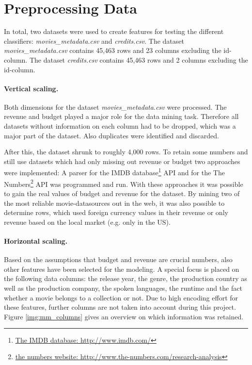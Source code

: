 \section{Preprocessing Data}
\label{cha:preprocessing}

In total, two datasets were used to create features for testing the different classifiers:
\textit{movies\_metadata.csv} and \textit{credits.csv}. The dataset \textit{movies\_metadata.csv} contains 45,463 rows and 23 columns excluding the id-column. The dataset \textit{credits.csv} contains 45,463 rows and 2 columns excluding the id-column.

\paragraph{Vertical scaling.}
Both dimensions for the dataset \textit{movies\_metadata.csv} were processed. The revenue and budget played a major role for the data mining task. Therefore all datasets without information on each column had to be dropped, which was a major part of the dataset. Also duplicates were identified and discarded. 
 
After this, the dataset shrunk to roughly 4,000 rows. To retain some numbers and still use datasets which had only missing out revenue or budget two approaches were implemented: A parser for the IMDB database\footnote{
\hyperref{http://www.imdb.com/}{external_sources}{ref:IMDB}{The IMDB database: http://www.imdb.com/}} API and for the The Numbers\footnote{\hyperref{http://www.the-numbers.com/research-analysis}{external_sources}{ref:numbers}{the numbers website: http://www.the-numbers.com/research-analysis}} API was programmed and run. With these approaches it was possible to gain the real values of budget and revenue for the dataset. By mining two of the most reliable movie-datasources out in the web, it was also possible to determine rows, which used foreign currency values in their revenue or only revenue based on the local market (e.g. only in the US).

\paragraph{Horizontal scaling.}
Based on the assumptions that budget and revenue are crucial numbers, also other features have been selected for the modeling. A special focus is placed on the following data columns: the release year, the genre, the production country as well as the production company, the spoken languages, the runtime and the fact whether a movie belongs to a collection or not. Due to high encoding effort for these features, further columns are not taken into account during this project. Figure \ref{img:mm_columns} gives an overview on which information was retained.

